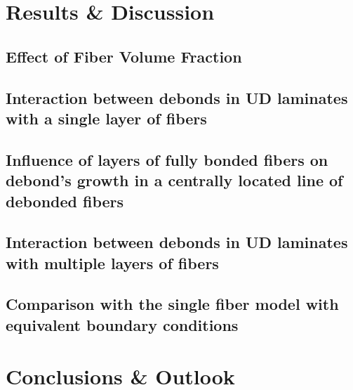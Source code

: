 \documentclass[review]{elsarticle}
\begin{document}
\section{Results \& Discussion}

\subsection{Effect of Fiber Volume Fraction}

\subsection{Interaction between debonds in UD laminates with a single layer of fibers}

\subsection{Influence of layers of fully bonded fibers on debond's growth in a centrally located line of debonded fibers}

\subsection{Interaction between debonds in UD laminates with multiple layers of fibers}

\subsection{Comparison with the single fiber model with equivalent boundary conditions}

\section{Conclusions \& Outlook}
\end{document}
